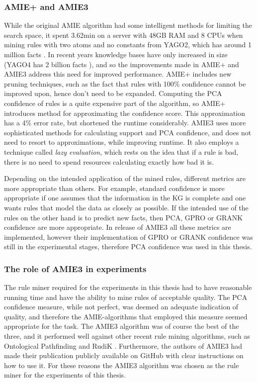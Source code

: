 \subsubsection{AMIE+ and AMIE3}
While the original AMIE algorithm had some intelligent methods for limiting the search space, it spent 3.62min on a server with 48GB RAM and 8 CPUs \cite{amie} when mining rules with two atoms and no constants from YAGO2, which has around 1 million facts \cite{yago2}. In recent years knowledge bases have only increased in size (YAGO4 has 2 billion facts \cite{yago4}), and so the improvements made in AMIE+ and AMIE3 address this need for improved performance. AMIE+ includes new pruning techniques, such as the fact that rules with 100\% confidence cannot be improved upon, hence don't need to be expanded. Computing the PCA confidence of rules is a quite expensive part of the algorithm, so AMIE+ introduces method for approximating the confidence score. This approximation has a 4\% error rate, but shortened the runtime considerably. AMIE3 uses more sophisticated methods for calculating support and PCA confidence, and does not need to resort to approximations, while improving runtime. It also employs a technique called \textit{lazy evaluation}, which rests on the idea that if a rule is bad, there is no need to spend resources calculating exactly how bad it is. 

Depending on the intended application of the mined rules, different metrics are more appropriate than others. For example, standard confidence is more appropriate if one assumes that the information in the KG is complete and one wants rules that model the data as closely as possible. If the intended use of the rules on the other hand is to predict new facts, then PCA, GPRO or GRANK confidence are more appropriate. In release of AMIE3 all these metrics are implemented, however their implementation of GPRO or GRANK confidence was still in the experimental stages, therefore PCA confidence was used in this thesis.


\subsubsection{The role of AMIE3 in experiments}
The rule miner required for the experiments in this thesis had to have reasonable running time and have the ability to mine rules of acceptable quality. The PCA confidence measure, while not perfect, was deemed an adequate indication of quality, and therefore the AMIE-algorithms that employed this measure seemed appropriate for the task. The AMIE3 algorithm was of course the best of the three, and it performed well against other recent rule mining algorithms, such as Ontological Pathfinding \cite{op} and RudiK \cite{rudik}. Furthermore, the authors of AMIE3 had made their publication publicly available on GitHub with clear instructions on how to use it. For these reasons the AMIE3 algorithm was chosen as the rule miner for the experiments of this thesis.








